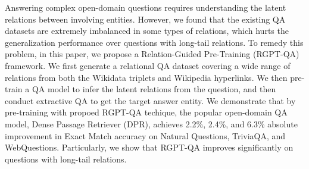Answering complex open-domain questions requires understanding the latent relations between involving entities. However, we found that the existing QA datasets are extremely imbalanced in some types of relations, which hurts the generalization performance over questions with long-tail relations. To remedy this problem, in this paper, we propose a Relation-Guided Pre-Training (RGPT-QA) framework. We first generate a relational QA dataset covering a wide range of relations from both the Wikidata triplets and Wikipedia hyperlinks. We then pre-train a QA model to infer the latent relations from the question, and then conduct extractive QA to get the target answer entity. We demonstrate that by pre-training with propoed RGPT-QA techique, the popular open-domain QA model, Dense Passage Retriever (DPR), achieves 2.2\%, 2.4\%, and 6.3\% absolute improvement in Exact Match accuracy  on Natural Questions, TriviaQA, and WebQuestions. Particularly, we show that RGPT-QA improves significantly on questions with long-tail relations.
